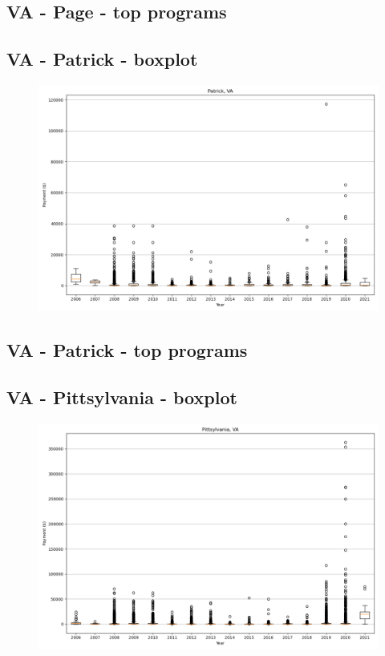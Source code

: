 \subsection*{VA - Page - top programs}

\newpage
\subsection*{VA - Patrick - boxplot}
\begin{figure}[h]
\centering
\includegraphics[width=7in]{../output/boxplots/counties/Patrick-VA_boxplot.png}
\end{figure}


\subsection*{VA - Patrick - top programs}

\newpage
\subsection*{VA - Pittsylvania - boxplot}
\begin{figure}[h]
\centering
\includegraphics[width=7in]{../output/boxplots/counties/Pittsylvania-VA_boxplot.png}
\end{figure}


